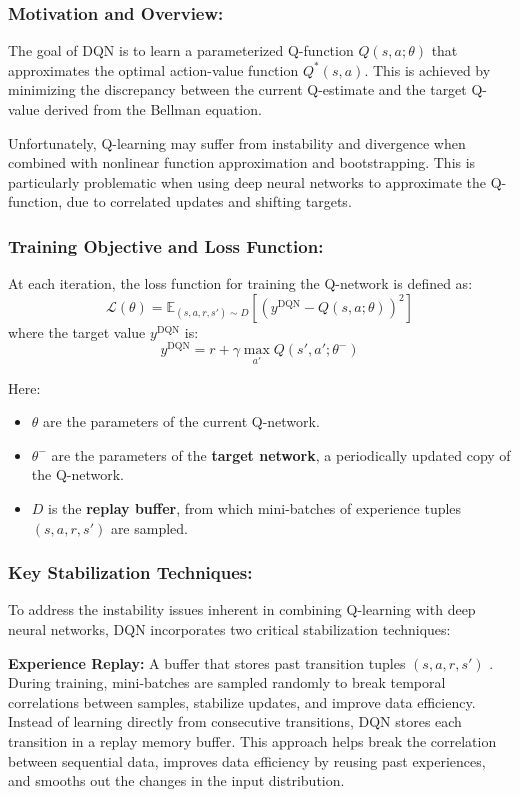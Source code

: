 \documentclass[../Main.tex]{subfiles}
\begin{document}
\subsubsection{Motivation and Overview:}

The goal of DQN is to learn a parameterized Q-function $Q(s, a; \theta)$ that approximates the optimal action-value function $Q^*(s, a)$. This is achieved by minimizing the discrepancy between the current Q-estimate and the target Q-value derived from the Bellman equation.

Unfortunately, Q-learning may suffer from instability and divergence when combined with nonlinear function approximation and bootstrapping. This is particularly problematic when using deep neural networks to approximate the Q-function, due to correlated updates and shifting targets.

\subsubsection{Training Objective and Loss Function:}

At each iteration, the loss function for training the Q-network is defined as:
\[
\mathcal{L}(\theta) = \mathbb{E}_{(s,a,r,s') \sim D} \left[ \left( y^{\text{DQN}} - Q(s, a; \theta) \right)^2 \right]
\]
where the target value $y^{\text{DQN}}$ is:
\[
y^{\text{DQN}} = r + \gamma \max_{a'} Q(s', a'; \theta^-)
\]

Here:
\begin{itemize}
    \item $\theta$ are the parameters of the current Q-network.
    \item $\theta^-$ are the parameters of the \textbf{target network}, a periodically updated copy of the Q-network.
    \item $D$ is the \textbf{replay buffer}, from which mini-batches of experience tuples $(s, a, r, s')$ are sampled.
\end{itemize}

\subsubsection{Key Stabilization Techniques:}

To address the instability issues inherent in combining Q-learning with deep neural networks, DQN incorporates two critical stabilization techniques:

\textbf{Experience Replay:} A buffer that stores past transition tuples $(s, a, r, s')$ \cite{lin1992self}. During training, mini-batches are sampled randomly to break temporal correlations between samples, stabilize updates, and improve data efficiency. Instead of learning directly from consecutive transitions, DQN stores each transition in a replay memory buffer. This approach helps break the correlation between sequential data, improves data efficiency by reusing past experiences, and smooths out the changes in the input distribution.
\end{document}
